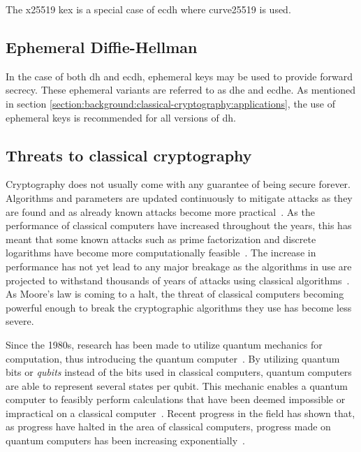 The \gls{x25519} \gls{kex} is a special case of \gls{ecdh} where \gls{curve25519} is used\cite{rfc7748}. 

\subsection{Ephemeral Diffie-Hellman}

In the case of both \gls{dh} and \gls{ecdh}, ephemeral keys may be used to provide forward secrecy. These ephemeral variants are referred to as \gls{dhe} and \gls{ecdhe}. As mentioned in section \ref{section:background:classical-cryptography:applications}, the use of ephemeral keys is recommended for all versions of \gls{dh}.

\subsection{Threats to classical cryptography}
\label{section:background:classical-cryptography-threats}

Cryptography does not usually come with any guarantee of being secure forever. Algorithms and parameters are updated continuously to mitigate attacks as they are found and as already known attacks become more practical~\cite{nist2019}. As the performance of classical computers have increased throughout the years, this has meant that some known attacks such as prime factorization and discrete logarithms have become more computationally feasible~\cite{theis2017}. The increase in performance has not yet lead to any major breakage as the algorithms in use are projected to withstand thousands of years of attacks using classical algorithms~\cite{thome2019}. As Moore's law is coming to a halt, the threat of classical computers becoming powerful enough to break the cryptographic algorithms they use has become less severe.

Since the 1980s, research has been made to utilize quantum mechanics for computation, thus introducing the quantum computer~\cite{benioff1980}. By utilizing quantum bits or \textit{\glspl{qubit}} instead of the bits used in classical computers, quantum computers are able to represent several states per \gls{qubit}. This mechanic enables a quantum computer to feasibly perform calculations that have been deemed impossible or impractical on a classical computer~\cite{jordan2021}. Recent progress in the field has shown that, as progress have halted in the area of classical computers, progress made on quantum computers has been increasing exponentially~\cite{ibm2020:quantum-computer}.

